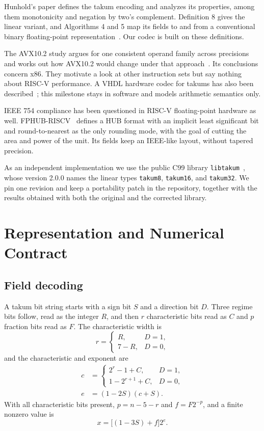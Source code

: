 \documentclass[conference]{IEEEtran}
\newcommand{\code}[1]{\texttt{#1}}
\begin{document}
Hunhold's paper defines the takum encoding and analyzes its properties, among
them monotonicity and negation by two's complement. Definition 8 gives the
linear variant, and Algorithms 4 and 5 map its fields to and from a conventional
binary floating-point representation~\cite{takum}. Our codec is built on these
definitions.

The AVX10.2 study argues for one consistent operand family across precisions and
works out how AVX10.2 would change under that approach~\cite{simd}. Its
conclusions concern x86. They motivate a look at other instruction sets but say
nothing about RISC-V performance. A VHDL hardware codec for takums has also been
described~\cite{takumvhdl}; this milestone stays in software and models
arithmetic semantics only.

IEEE 754 compliance has been questioned in RISC-V floating-point hardware as
well. FPHUB-RISCV~\cite{fphub} defines a HUB format with an implicit least
significant bit and round-to-nearest as the only rounding mode, with the goal of
cutting the area and power of the unit. Its fields keep an IEEE-like layout,
without tapered precision.

As an independent implementation we use the public C99 library
\code{libtakum}~\cite{libtakum}, whose version 2.0.0 names the linear types
\code{takum8}, \code{takum16}, and \code{takum32}. We pin one revision and keep a
portability patch in the repository, together with the results obtained with
both the original and the corrected library.

\section{Representation and Numerical Contract}
\subsection{Field decoding}
A takum bit string starts with a sign bit $S$ and a direction bit $D$. Three
regime bits follow, read as the integer $R$, and then $r$ characteristic bits
read as $C$ and $p$ fraction bits read as $F$. The characteristic width is
\begin{equation}
 r=\begin{cases}R,&D=1,\\7-R,&D=0,\end{cases}
\end{equation}
and the characteristic and exponent are
\begin{align}
 c&=\begin{cases}2^r-1+C,&D=1,\\1-2^{r+1}+C,&D=0,\end{cases}\\
 e&=(1-2S)(c+S).
\end{align}
With all characteristic bits present, $p=n-5-r$ and $f=F2^{-p}$, and a finite
nonzero value is
\begin{equation}
 x=\bigl[(1-3S)+f\bigr]2^e.
\end{equation}
\end{document}
